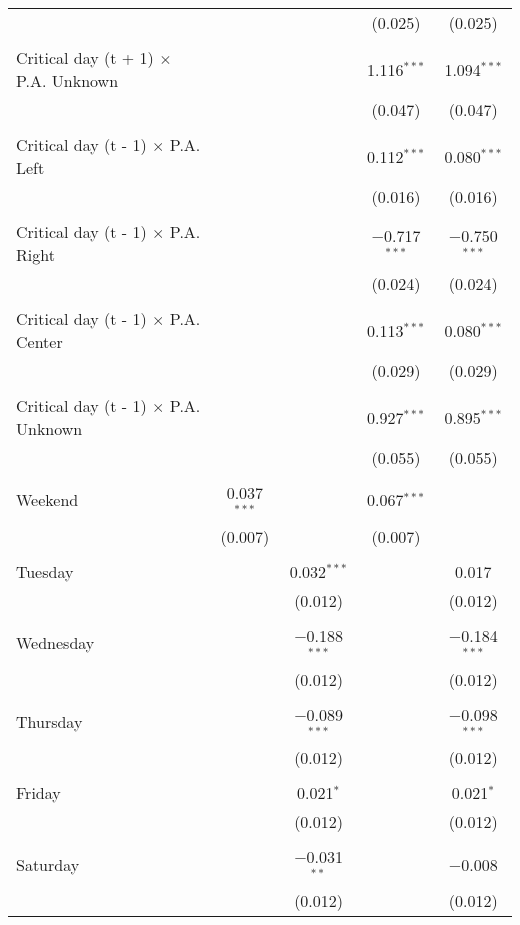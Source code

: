 \documentclass[
]{article}
\begin{document}
\begin{table}[!htbp]
{\begin{tabular}{@{\extracolsep{5pt}}lcccc}
  &  &  & (0.025) & (0.025) \\ 
  & & & & \\ 
 Critical day (t + 1) $\times$ P.A. Unknown &  &  & 1.116$^{***}$ & 1.094$^{***}$ \\ 
  &  &  & (0.047) & (0.047) \\ 
  & & & & \\ 
 Critical day (t - 1) $\times$ P.A. Left &  &  & 0.112$^{***}$ & 0.080$^{***}$ \\ 
  &  &  & (0.016) & (0.016) \\ 
  & & & & \\ 
 Critical day (t - 1) $\times$ P.A. Right &  &  & $-$0.717$^{***}$ & $-$0.750$^{***}$ \\ 
  &  &  & (0.024) & (0.024) \\ 
  & & & & \\ 
 Critical day (t - 1) $\times$ P.A. Center &  &  & 0.113$^{***}$ & 0.080$^{***}$ \\ 
  &  &  & (0.029) & (0.029) \\ 
  & & & & \\ 
 Critical day (t - 1) $\times$ P.A. Unknown &  &  & 0.927$^{***}$ & 0.895$^{***}$ \\ 
  &  &  & (0.055) & (0.055) \\ 
  & & & & \\ 
 Weekend & 0.037$^{***}$ &  & 0.067$^{***}$ &  \\ 
  & (0.007) &  & (0.007) &  \\ 
  & & & & \\ 
 Tuesday &  & 0.032$^{***}$ &  & 0.017 \\ 
  &  & (0.012) &  & (0.012) \\ 
  & & & & \\ 
 Wednesday &  & $-$0.188$^{***}$ &  & $-$0.184$^{***}$ \\ 
  &  & (0.012) &  & (0.012) \\ 
  & & & & \\ 
 Thursday &  & $-$0.089$^{***}$ &  & $-$0.098$^{***}$ \\ 
  &  & (0.012) &  & (0.012) \\ 
  & & & & \\ 
 Friday &  & 0.021$^{*}$ &  & 0.021$^{*}$ \\ 
  &  & (0.012) &  & (0.012) \\ 
  & & & & \\ 
 Saturday &  & $-$0.031$^{**}$ &  & $-$0.008 \\ 
  &  & (0.012) &  & (0.012) \\ 

\end{tabular}}
\end{table}
\end{document}
